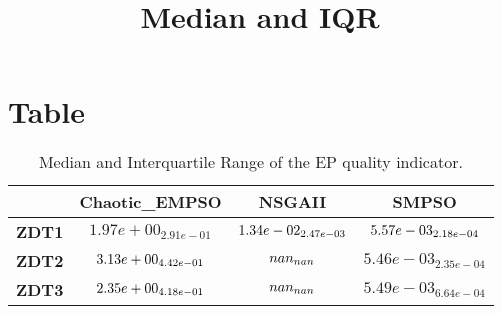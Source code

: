 \documentclass{article}
\title{Median and IQR}
\author{}
\begin{document}
\maketitle
\section{Table}
\begin{table}[!htp]
  \caption{Median and Interquartile Range of the EP quality indicator.}
  \label{table:EP}
  \centering
  \begin{scriptsize}
  \begin{tabular}{c|ccc}
      & \textbf{Chaotic\_EMPSO} & \textbf{NSGAII} & \textbf{SMPSO} \\\hline
      \textbf{ZDT1} & $1.97e+00_{2.91e-01} $ & $ \cellcolor{gray25} 1.34e-02_{2.47e-03} $ & $ \cellcolor{gray95} 5.57e-03_{2.18e-04}$ \\
      \textbf{ZDT2} & $\cellcolor{gray95} 3.13e+00_{4.42e-01} $ & $ \cellcolor{gray25} nan_{nan} $ & $ 5.46e-03_{2.35e-04}$ \\
      \textbf{ZDT3} & $\cellcolor{gray95} 2.35e+00_{4.18e-01} $ & $ \cellcolor{gray25} nan_{nan} $ & $ 5.49e-03_{6.64e-04}$ \\
  \end{tabular}
  \end{scriptsize}
\end{table}
\end{document}

